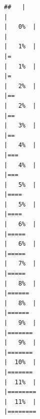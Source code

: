 \documentclass[
  bookmarksnumbered]{article}
\begin{document}
\begin{verbatim}
##   |                                                                              |                                                                      |   0%  |                                                                              |                                                                      |   1%  |                                                                              |=                                                                     |   1%  |                                                                              |=                                                                     |   2%  |                                                                              |==                                                                    |   2%  |                                                                              |==                                                                    |   3%  |                                                                              |==                                                                    |   4%  |                                                                              |===                                                                   |   4%  |                                                                              |===                                                                   |   5%  |                                                                              |====                                                                  |   5%  |                                                                              |====                                                                  |   6%  |                                                                              |=====                                                                 |   6%  |                                                                              |=====                                                                 |   7%  |                                                                              |=====                                                                 |   8%  |                                                                              |======                                                                |   8%  |                                                                              |======                                                                |   9%  |                                                                              |=======                                                               |   9%  |                                                                              |=======                                                               |  10%  |                                                                              |=======                                                               |  11%  |                                                                              |========                                                              |  11%  |                                                                              |========  
\end{verbatim}
\end{document}
